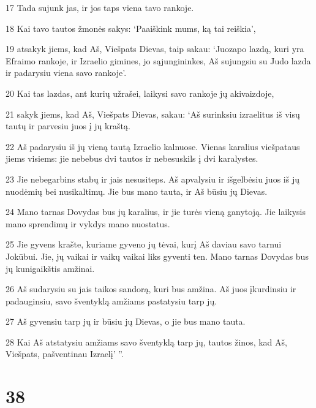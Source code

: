 \par 17 Tada sujunk jas, ir jos taps viena tavo rankoje. 
\par 18 Kai tavo tautos žmonės sakys: ‘Paaiškink mums, ką tai reiškia’, 
\par 19 atsakyk jiems, kad Aš, Viešpats Dievas, taip sakau: ‘Juozapo lazdą, kuri yra Efraimo rankoje, ir Izraelio gimines, jo sąjungininkes, Aš sujungsiu su Judo lazda ir padarysiu viena savo rankoje’. 
\par 20 Kai tas lazdas, ant kurių užrašei, laikysi savo rankoje jų akivaizdoje, 
\par 21 sakyk jiems, kad Aš, Viešpats Dievas, sakau: ‘Aš surinksiu izraelitus iš visų tautų ir parvesiu juos į jų kraštą. 
\par 22 Aš padarysiu iš jų vieną tautą Izraelio kalnuose. Vienas karalius viešpataus jiems visiems: jie nebebus dvi tautos ir nebesuskils į dvi karalystes. 
\par 23 Jie nebegarbins stabų ir jais nesusiteps. Aš apvalysiu ir išgelbėsiu juos iš jų nuodėmių bei nusikaltimų. Jie bus mano tauta, ir Aš būsiu jų Dievas. 
\par 24 Mano tarnas Dovydas bus jų karalius, ir jie turės vieną ganytoją. Jie laikysis mano sprendimų ir vykdys mano nuostatus. 
\par 25 Jie gyvens krašte, kuriame gyveno jų tėvai, kurį Aš daviau savo tarnui Jokūbui. Jie, jų vaikai ir vaikų vaikai liks gyventi ten. Mano tarnas Dovydas bus jų kunigaikštis amžinai. 
\par 26 Aš sudarysiu su jais taikos sandorą, kuri bus amžina. Aš juos įkurdinsiu ir padauginsiu, savo šventyklą amžiams pastatysiu tarp jų. 
\par 27 Aš gyvensiu tarp jų ir būsiu jų Dievas, o jie bus mano tauta. 
\par 28 Kai Aš atstatysiu amžiams savo šventyklą tarp jų, tautos žinos, kad Aš, Viešpats, pašventinau Izraelį’ ”.



\chapter{38}


